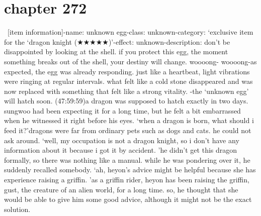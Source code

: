 \section{chapter 272}






 [item information]-name: unknown egg-class: unknown-category: ‘exclusive item for the ‘dragon knight (★★★★★)’-effect: unknown-description: don’t be disappointed by looking at the shell.
 if you protect this egg, the moment something breaks out of the shell, your destiny will change.
woooong- woooong-as expected, the egg was already responding.
 just like a heartbeat, light vibrations were ringing at regular intervals.
 what felt like a cold stone disappeared and was now replaced with something that felt like a strong vitality.
-the ‘unknown egg’ will hatch soon.
 (47:59:59)a dragon was supposed to hatch exactly in two days.
 sungwoo had been expecting it for a long time, but he felt a bit embarrassed when he witnessed it right before his eyes.
‘when a dragon is born, what should i feed it?’dragons were far from ordinary pets such as dogs and cats.
 he could not ask around.
‘well, my occupation is not a dragon knight, so i don’t have any information about it because i got it by accident.
’he didn’t get this dragon formally, so there was nothing like a manual.
while he was pondering over it, he suddenly recalled somebody.
‘ah, heyon’s advice might be helpful because she has experience raising a griffin.
’as a griffin rider, heyon has been raising the griffin, gust, the creature of an alien world, for a long time.
 so, he thought that she would be able to give him some good advice, although it might not be the exact solution.

